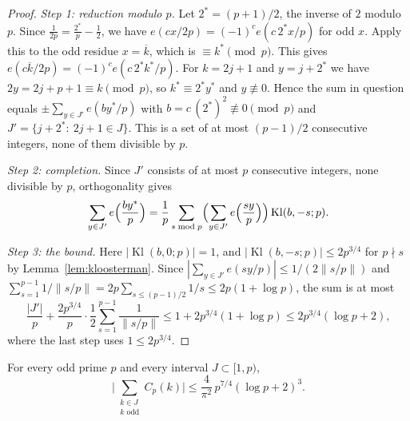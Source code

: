 \begin{proof}
\emph{Step 1: reduction modulo $p$.} Let $2^*=(p+1)/2$, the inverse of $2$ modulo $p$. Since $\frac1{2p}=\frac{2^*}{p}-\frac12$, we have $e(cx/2p)=(-1)^ce(c\,2^*x/p)$ for odd $x$. Apply this to the odd residue $x=\overline{k}$, which is $\equiv k^*\pmod p$. This gives $e(c\overline{k}/2p)=(-1)^ce(c\,2^*k^*/p)$. For $k=2j+1$ and $y=j+2^*$ we have $2y=2j+p+1\equiv k\pmod p$, so $k^*\equiv2^*y^*$ and $y\not\equiv0$. Hence the sum in question equals $\pm\sum_{y\in J'}e(by^*/p)$ with $b=c\,(2^*)^2\not\equiv0\pmod p$ and $J'=\{j+2^*:\ 2j+1\in J\}$. This is a set of at most $(p-1)/2$ consecutive integers, none of them divisible by $p$.

\emph{Step 2: completion.} Since $J'$ consists of at most $p$ consecutive integers, none divisible by $p$, orthogonality gives
\[
\sum_{y\in J'}e\Bigl(\frac{by^*}{p}\Bigr)=\frac1p\sum_{s\bmod p}\Bigl(\sum_{y\in J'}e\Bigl(\frac{sy}{p}\Bigr)\Bigr)
\operatorname{Kl}(b,-s;p).
\]

\emph{Step 3: the bound.} Here $|\operatorname{Kl}(b,0;p)|=1$, and $|\operatorname{Kl}(b,-s;p)|\le2p^{3/4}$ for $p\nmid s$ by Lemma~\ref{lem:kloosterman}. Since $|\sum_{y\in J'}e(sy/p)|\le1/(2\|s/p\|)$ and $\sum_{s=1}^{p-1}1/\|s/p\|=2p\sum_{s\le(p-1)/2}1/s\le2p(1+\log p)$, the sum is at most
\[
\frac{|J'|}{p}+\frac{2p^{3/4}}{p}\cdot\frac12\sum_{s=1}^{p-1}\frac1{\|s/p\|}\le1+2p^{3/4}(1+\log p)\le2p^{3/4}(\log p+2),
\]
where the last step uses $1\le2p^{3/4}$.
\end{proof}

\begin{lemma}\label{lem:Cp-interval}
For every odd prime $p$ and every interval $J\subset[1,p)$,
\[
\Big|\sum_{\substack{k\in J\\ k\text{ odd}}}C_p(k)\Big|\le\frac4{\pi^2}\,p^{7/4}(\log p+2)^3.
\]
\end{lemma}

